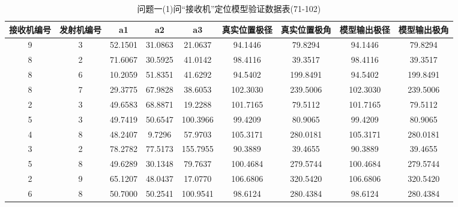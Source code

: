 \documentclass[withoutpreface,bwprint]{cumcmthesis}
\begin{document}
\begin{appendices}
		\begin{table}[htbp!]
			\caption{问题一(1)问“接收机”定位模型验证数据表(71-102)}
			\footnotesize
			\centering
			\begin{tabular}{@{}ccccccccc@{}}
				\toprule
				\textbf{接收机编号} & \textbf{发射机编号} & \textbf{a1} & \textbf{a2} & \textbf{a3} & \textbf{真实位置极径} & \textbf{真实位置极角} & \textbf{模型输出极径} & \textbf{模型输出极角} \\ \midrule
				9              & 3              & 52.1501     & 31.0863     & 21.0637     & 94.1446         & 79.8294         & 94.1446         & 79.8294         \\
				8              & 2              & 71.6067     & 30.5925     & 41.0142     & 98.4116         & 39.3517         & 98.4116         & 39.3517         \\
				8              & 6              & 10.2059     & 51.8351     & 41.6292     & 94.5402         & 199.8491        & 94.5402         & 199.8491        \\
				8              & 7              & 29.3775     & 67.9828     & 38.6053     & 102.3030        & 239.5006        & 102.3030        & 239.5006        \\
				2              & 3              & 49.6583     & 68.8871     & 19.2288     & 101.7165        & 79.5112         & 101.7165        & 79.5112         \\
				5              & 3              & 49.7419     & 50.6547     & 100.3966    & 99.4209         & 80.9065         & 99.4209         & 80.9065         \\
				4              & 8              & 48.2407     & 9.7296      & 57.9703     & 105.3171        & 280.0181        & 105.3171        & 280.0181        \\
				3              & 2              & 78.2782     & 77.5173     & 155.7955    & 90.3889         & 39.4655         & 90.3889         & 39.4655         \\
				5              & 8              & 49.6289     & 30.1348     & 79.7637     & 100.4684        & 279.5744        & 100.4684        & 279.5744        \\
				2              & 9              & 65.1207     & 48.0437     & 17.0770     & 106.6806        & 320.5420        & 106.6806        & 320.5420        \\
				6              & 8              & 50.7000     & 50.2541     & 100.9541    & 98.6124         & 280.4384        & 98.6124         & 280.4384        \\

\end{tabular}
\end{table}
\end{appendices}
\end{document}
